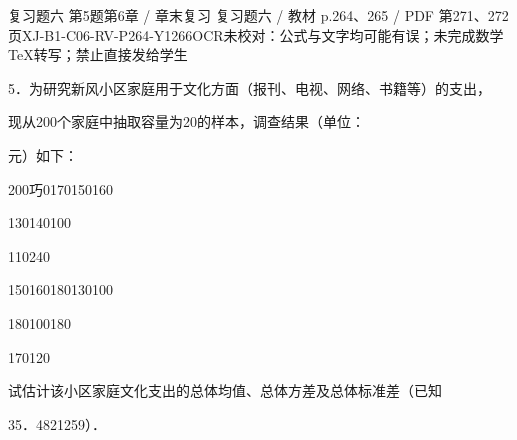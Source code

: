 \begin{bankitem}{复习题六 第5题}{第6章 / 章末复习 复习题六 / 教材 p.264、265 / PDF 第271、272页}{XJ-B1-C06-RV-P264-Y1266}{OCR未校对：公式与文字均可能有误；未完成数学TeX转写；禁止直接发给学生}
\begin{ocrdraft}
\par
5．为研究新风小区家庭用于文化方面（报刊、电视、网络、书籍等）的支出，
\par
现从200个家庭中抽取容量为20的样本，调查结果（单位：
\par
元）如下：
\par
200巧0170150160
\par
130140100
\par
110240
\par
150160180130100
\par
180100180
\par
170120
\par
试估计该小区家庭文化支出的总体均值、总体方差及总体标准差（已知
\par
35．4821259）．
\par
[教材p.265 / PDF第272页]
\end{ocrdraft}
\end{bankitem}
